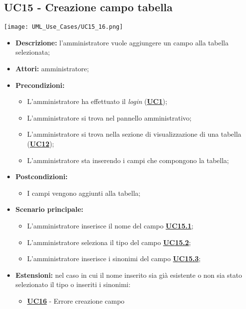 \subsection{UC15 - Creazione campo tabella}
\label{sec:UC15}
\texttt{[image: UML\_Use\_Cases/UC15\_16.png]}
\begin{itemize}
	\item \textbf{Descrizione:} l’amministratore vuole aggiungere un campo alla tabella selezionata;
	\item \textbf{Attori:} amministratore;
	\item \textbf{Precondizioni:} 
	\begin{itemize}
		\item L’amministratore ha effettuato il \textit{login} (\hyperref[sec:UC1]{\textbf{UC1}});
		\item L’amministratore si trova nel pannello amministrativo;
		\item L’amministratore si trova nella sezione di visualizzazione di una tabella (\hyperref[sec:UC12]{\textbf{UC12}});
		\item L’amministratore sta inserendo i campi che compongono la tabella;
	\end{itemize}
	\item \textbf{Postcondizioni:} 
	\begin{itemize}
		\item I campi vengono aggiunti alla tabella;
	\end{itemize}
	\item \textbf{Scenario principale:} 
	\begin{itemize}
		\item L’amministratore inserisce il nome del campo \hyperref[sec:UC15.1]{\textbf{UC15.1}};
		\item L'amministratore seleziona il tipo del campo \hyperref[sec:UC15.2]{\textbf{UC15.2}};
		\item L'amministratore inserisce i sinonimi del campo \hyperref[sec:UC15.3]{\textbf{UC15.3}};
	\end{itemize}
	\item \textbf{Estensioni:} nel caso in cui il nome inserito sia già esistente o non sia stato selezionato il tipo o inseriti i sinonimi:
	\begin{itemize}
		\item \hyperref[sec:UC16]{\textbf{UC16}} - Errore creazione campo
	\end{itemize}
\end{itemize}

